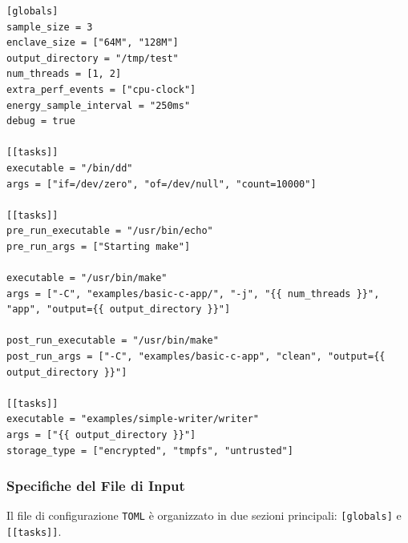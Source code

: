 \documentclass{article}
\begin{document}
\begin{verbatim}
[globals]
sample_size = 3
enclave_size = ["64M", "128M"]
output_directory = "/tmp/test"
num_threads = [1, 2]
extra_perf_events = ["cpu-clock"]
energy_sample_interval = "250ms"
debug = true

[[tasks]]
executable = "/bin/dd"
args = ["if=/dev/zero", "of=/dev/null", "count=10000"]

[[tasks]]
pre_run_executable = "/usr/bin/echo"
pre_run_args = ["Starting make"]

executable = "/usr/bin/make"
args = ["-C", "examples/basic-c-app/", "-j", "{{ num_threads }}", "app", "output={{ output_directory }}"]

post_run_executable = "/usr/bin/make"
post_run_args = ["-C", "examples/basic-c-app", "clean", "output={{ output_directory }}"]

[[tasks]]
executable = "examples/simple-writer/writer"
args = ["{{ output_directory }}"]
storage_type = ["encrypted", "tmpfs", "untrusted"]
\end{verbatim}

\subsubsection*{Specifiche del File di Input}
Il file di configurazione \texttt{TOML} è organizzato in due sezioni principali: \texttt{[globals]} e \texttt{[[tasks]]}.
\end{document}
